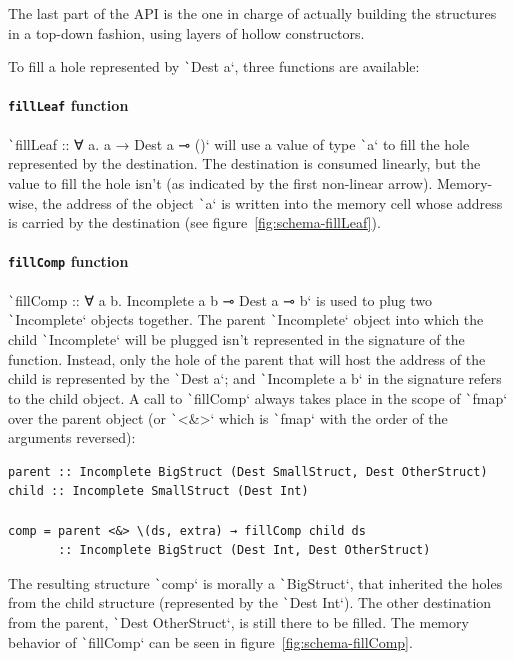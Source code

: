 \documentclass[english]{jflart}
\begin{document}
The last part of the API is the one in charge of actually building the structures in a top-down fashion, using layers of hollow constructors. 

To fill a hole represented by \texttt`Dest a`, three functions are available:

\paragraph{\texttt{fillLeaf} function}

\texttt`fillLeaf :: ∀ a. a → Dest a ⊸ ()` will use a value of type \texttt`a` to fill the hole represented by the destination. The destination is consumed linearly, but the value to fill the hole isn't (as indicated by the first non-linear arrow). Memory-wise, the address of the object \texttt`a` is written into the memory cell whose address is carried by the destination (see figure~\ref{fig:schema-fillLeaf}).

\paragraph{\texttt{fillComp} function}

\texttt`fillComp :: ∀ a b. Incomplete a b ⊸ Dest a ⊸ b` is used to plug two \texttt`Incomplete` objects together. The parent \texttt`Incomplete` object into which the child \texttt`Incomplete` will be plugged isn't represented in the signature of the function. Instead, only the hole of the parent that will host the address of the child is represented by the \texttt`Dest a`; and \texttt`Incomplete a b` in the signature refers to the child object. A call to \texttt`fillComp` always takes place in the scope of \texttt`fmap` over the parent object (or \texttt`<&>` which is \texttt`fmap` with the order of the arguments reversed):
{\small
\begin{verbatim}
parent :: Incomplete BigStruct (Dest SmallStruct, Dest OtherStruct)
child :: Incomplete SmallStruct (Dest Int)

comp = parent <&> \(ds, extra) → fillComp child ds
       :: Incomplete BigStruct (Dest Int, Dest OtherStruct)
\end{verbatim}
}
The resulting structure \texttt`comp` is morally a \texttt`BigStruct`, that inherited the holes from the child structure (represented by the \texttt`Dest Int`). The other destination from the parent, \texttt`Dest OtherStruct`, is still there to be filled. The memory behavior of \texttt`fillComp` can be seen in figure~\ref{fig:schema-fillComp}.
\end{document}
